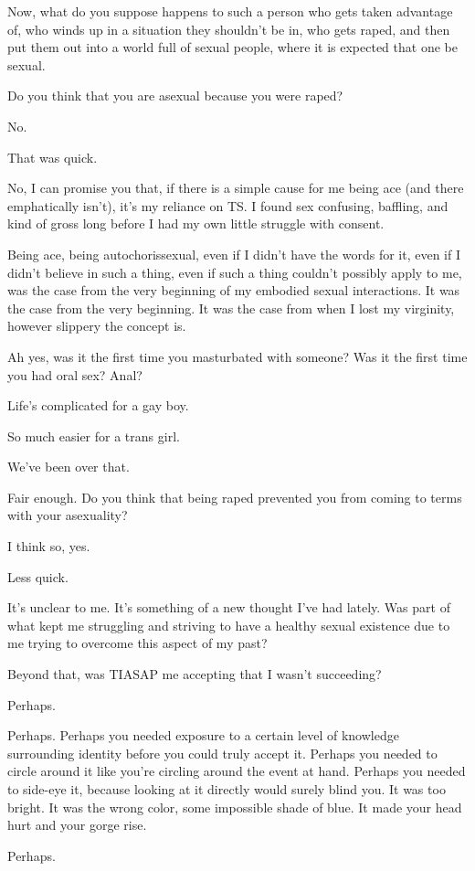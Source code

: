 Now, what do you suppose happens to such a person who gets taken advantage of, who winds up in a situation they shouldn't be in, who gets raped, and then put them out into a world full of sexual people, where it is expected that one be sexual.
\newpage

\begin{ally}
Do you think that you are asexual because you were raped?
\end{ally}
No.

\begin{ally}
That was quick.
\end{ally}
No, I can promise you that, if there is a simple cause for me being ace (and there emphatically isn't), it's my reliance on TS. I found sex confusing, baffling, and kind of gross long before I had my own little struggle with consent.

Being ace, being autochorissexual, even if I didn't have the words for it, even if I didn't believe in such a thing, even if such a thing couldn't possibly apply to me, was the case from the very beginning of my embodied sexual interactions. It was the case from the very beginning. It was the case from when I lost my virginity, however slippery the concept is.

\begin{ally}
Ah yes, was it the first time you masturbated with someone? Was it the first time you had oral sex? Anal?
\end{ally}
Life's complicated for a gay boy.

\begin{ally}
So much easier for a trans girl.
\end{ally}
We've been over that.

\begin{ally}
Fair enough. Do you think that being raped prevented you from coming to terms with your asexuality?
\end{ally}
I think so, yes.

\begin{ally}
Less quick.
\end{ally}
It's unclear to me. It's something of a new thought I've had lately. Was part of what kept me struggling and striving to have a healthy sexual existence due to me trying to overcome this aspect of my past?

Beyond that, was TIASAP me accepting that I wasn't succeeding?

Perhaps.

\begin{ally}
Perhaps. Perhaps you needed exposure to a certain level of knowledge surrounding identity before you could truly accept it. Perhaps you needed to circle around it like you're circling around the event at hand. Perhaps you needed to side-eye it, because looking at it directly would surely blind you. It was too bright. It was the wrong color, some impossible shade of blue. It made your head hurt and your gorge rise.
\end{ally}
Perhaps.
\newpage

